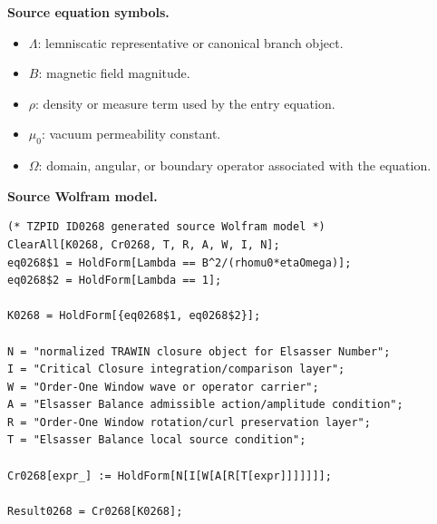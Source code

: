 \begin{minipage}[t]{0.49\linewidth}
\begingroup
\small
\raggedright
\textbf{Source equation symbols.}\par
\begin{itemize}[leftmargin=1.35em,itemsep=1pt,topsep=1pt,parsep=0pt]
    \item $\Lambda$: lemniscatic representative or canonical branch object.
    \item $B$: magnetic field magnitude.
    \item $\rho$: density or measure term used by the entry equation.
    \item $\mu_0$: vacuum permeability constant.
    \item $\Omega$: domain, angular, or boundary operator associated with the equation.
\end{itemize}
\endgroup
\end{minipage}\hfill
\begin{minipage}[t]{0.47\linewidth}
\begingroup
\scriptsize
\raggedright
\textbf{Source Wolfram model.}\par
\begin{Verbatim}[fontsize=\tiny,breaklines=true,breakanywhere=true]
(* TZPID ID0268 generated source Wolfram model *)
ClearAll[K0268, Cr0268, T, R, A, W, I, N];
eq0268$1 = HoldForm[Lambda == B^2/(rhomu0*etaOmega)];
eq0268$2 = HoldForm[Lambda == 1];

K0268 = HoldForm[{eq0268$1, eq0268$2}];

N = "normalized TRAWIN closure object for Elsasser Number";
I = "Critical Closure integration/comparison layer";
W = "Order-One Window wave or operator carrier";
A = "Elsasser Balance admissible action/amplitude condition";
R = "Order-One Window rotation/curl preservation layer";
T = "Elsasser Balance local source condition";

Cr0268[expr_] := HoldForm[N[I[W[A[R[T[expr]]]]]]];

Result0268 = Cr0268[K0268];
\end{Verbatim}
\endgroup
\end{minipage}


